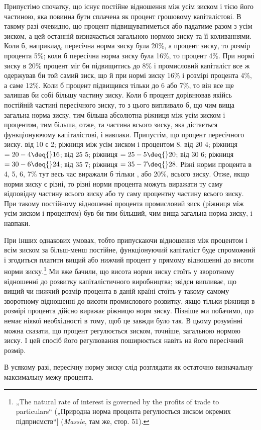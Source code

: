 
Припустімо спочатку, що існує постійне відношення між усім
зиском і тією його частиною, яка повинна бути сплачена як процент
грошовому капіталістові. В такому разі очевидно, що процент
підвищуватиметься або падатиме разом з усім зиском, а цей
останній визначається загальною нормою зиску та її коливаннями.
Коли б, наприклад, пересічна норма зиску була \deq{} 20\%, а процент
\deq{}  зиску, то розмір процента \deq{} 5\%; коли б пересічна
норма зиску була \deq{} 16\%, то процент \deq{} 4\%. При нормі зиску в
20\% процент міг би підвищитись до 8\% і промисловий капіталіст
все ж одержував би той самий зиск, що й при нормі зиску
\deq{} 16\% і розмірі процента \deq{} 4\%, а саме 12\%. Коли б процент
підвищився тільки до 6 або 7\%, то він все ще залишав би собі
більшу частину зиску. Коли б процент дорівнював якійсь постійній
частині пересічного зиску, то з цього випливало б, що
чим вища загальна норма зиску, тим більша абсолютна ріжниця
між усім зиском і процентом, тим більша, отже, та частина
всього зиску, яка дістається функціонуючому капіталістові, і навпаки.
Припустім, що процент \deq{}  пересічного зиску.  від 10
є 2; ріжниця між усім зиском і процентом \deq{} 8.  від 20 \deq{} 4;
ріжниця $= 20 - 4 \deq{} 16$;  від 25 \deq{} 5; ріжниця $= 25 - 5 \deq{} 20$;  від
30 \deq{} 6; ріжниця $= 30 - 6 \deq{} 24$;  від 35 \deq{} 7; ріжниця $= 35 - 7 \deq{} 28$.
Різні норми процента в 4, 5, 6, 7\% тут весь час виражали б
тільки , або 20\%, всього зиску. Отже, якщо норми зиску є різні,
то різні норми процента можуть виражати ту саму відповідну
частину всього зиску або ту саму процентну частину всього
зиску. При такому постійному відношенні процента промисловий
зиск (ріжниця між усім зиском і процентом) був би тим більший,
чим вища загальна норма зиску, і навпаки.

При інших однакових умовах, тобто припускаючи відношення
між процентом і всім зиском за більш-менш постійне, функціонуючий
капіталіст буде спроможний і згодиться платити вищий
або нижчий процент у прямому відношенні до висоти норми
зиску.\footnote{
„The natural rate of interest із governed by the profits of trade to particulars“
(„Природна норма процента регулюється зиском окремих підприємств“]
(\emph{Massie}, там же, стор. 51).
} Ми вже бачили, що висота норми зиску стоїть у зворотному
відношенні до розвитку капіталістичного виробництва;
звідси випливає, що вищий чи нижчий розмір процента в даній
країні стоїть у такому самому зворотному відношенні до висоти
промислового розвитку, якщо тільки ріжниця в розмірі
процента дійсно виражає ріжницю норм зиску. Пізніше ми побачимо,
що немає ніякої необхідності в тому, щоб це завжди
було так. В цьому розумінні можна сказати, що процент регулюється
зиском, точніше, загальною нормою зиску. І цей спосіб
його регулювання поширюється навіть на його пересічний розмір.

В усякому разі, пересічну норму зиску слід розглядати як
остаточно визначальну максимальну межу процента.
